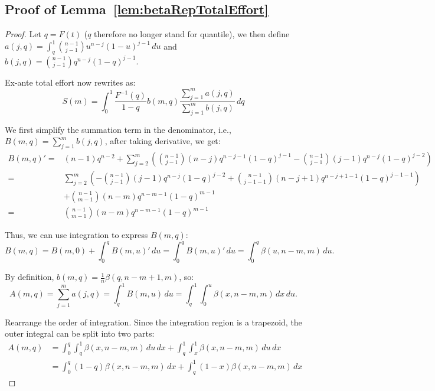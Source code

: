 \subsection*{Proof of Lemma~\ref{lem:betaRepTotalEffort}}
\begin{proof}
    Let $q=F(t)$ ($q$ therefore no longer stand for quantile), we then define $a(j,q)=\int_q^1\binom{n-1}{j-1}u^{n-j}(1-u)^{j-1}\,du$ and $b(j,q)=\binom{n-1}{j-1}q^{n-j}(1-q)^{j-1}$.

    Ex-ante total effort now rewrites as:
    \[
    S(m)=\int_0^1\frac{F^{-1}(q)}{1-q}b(m,q)\frac{\sum_{j=1}^{m}a(j,q)}{\sum_{j=1}^{m}b(j,q)}\,dq
    \]

    We first simplify the summation term in the denominator, i.e., $B(m,q)=\sum_{j=1}^{m}b(j,q)$, after taking derivative, we get:
    $$
\begin{aligned}
B(m,q)' = &(n-1)q^{n-2}+\sum_{j=2}^m(\binom{n-1}{j-1}(n-j)q^{n-j-1}(1-q)^{j-1}-\binom{n-1}{j-1}(j-1)q^{n-j}(1-q)^{j-2}) \\ = & \sum_{j=2}^m (-\binom{n-1}{j-1}(j-1)q^{n-j}(1-q)^{j-2}+\binom{n-1}{j-1-1}(n-j+1)q^{n-j+1-1}(1-q)^{j-1-1})\\&+\binom{n-1}{m-1}(n-m)q^{n-m-1}(1-q)^{m-1} \\= &\binom{n-1}{m-1}(n-m)q^{n-m-1}(1-q)^{m-1}    
\end{aligned}
$$

Thus, we can use integration to express $B(m,q)$:
$$B(m,q)=B(m,0)+\int_0^qB(m,u)'\,du=\int_0^qB(m,u)'\, du=\int_0^q\beta(u,n-m,m)\,du.$$

By definition, $b(m,q)=\frac{1}{n}\beta(q,n-m+1,m)$, so:
$$A(m,q)=\sum_{j=1}^{m}a(j,q)=\int_q^1B(m,u)\, du=\int_q^1\int_0^u \beta(x,n-m,m)\, dx\, du.$$

Rearrange the order of integration. Since the integration region is a trapezoid, the outer integral can be split into two parts:
$$
\begin{aligned} 
A(m,q)&=\int_0^q\int_q^1\beta(x,n-m,m)\,du\,dx+\int_q^1\int_x^1 \beta(x,n-m,m)\,du\,dx  \\&= \int_0^q(1-q)\beta(x,n-m,m)\,dx+\int_q^1(1-x) \beta(x,n-m,m)\,dx  
\end{aligned}
$$


\end{proof}
